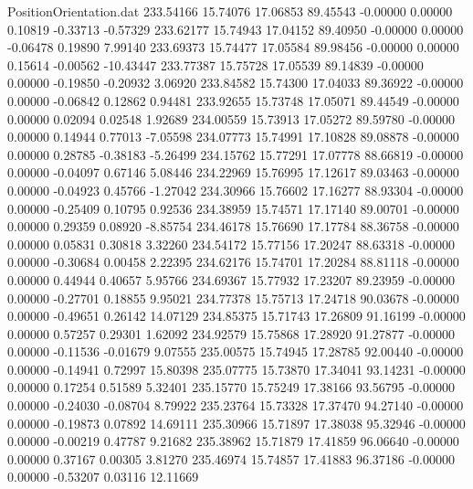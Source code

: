 \begin{filecontents}{PositionOrientation.dat}
 233.54166   15.74076   17.06853    89.45543   -0.00000    0.00000    0.10819   -0.33713   -0.57329
 233.62177   15.74943   17.04152    89.40950   -0.00000    0.00000   -0.06478    0.19890    7.99140
 233.69373   15.74477   17.05584    89.98456   -0.00000    0.00000    0.15614   -0.00562  -10.43447
 233.77387   15.75728   17.05539    89.14839   -0.00000    0.00000   -0.19850   -0.20932    3.06920
 233.84582   15.74300   17.04033    89.36922   -0.00000    0.00000   -0.06842    0.12862    0.94481
 233.92655   15.73748   17.05071    89.44549   -0.00000    0.00000    0.02094    0.02548    1.92689
 234.00559   15.73913   17.05272    89.59780   -0.00000    0.00000    0.14944    0.77013   -7.05598
 234.07773   15.74991   17.10828    89.08878   -0.00000    0.00000    0.28785   -0.38183   -5.26499
 234.15762   15.77291   17.07778    88.66819   -0.00000    0.00000   -0.04097    0.67146    5.08446
 234.22969   15.76995   17.12617    89.03463   -0.00000    0.00000   -0.04923    0.45766   -1.27042
 234.30966   15.76602   17.16277    88.93304   -0.00000    0.00000   -0.25409    0.10795    0.92536
 234.38959   15.74571   17.17140    89.00701   -0.00000    0.00000    0.29359    0.08920   -8.85754
 234.46178   15.76690   17.17784    88.36758   -0.00000    0.00000    0.05831    0.30818    3.32260
 234.54172   15.77156   17.20247    88.63318   -0.00000    0.00000   -0.30684    0.00458    2.22395
 234.62176   15.74701   17.20284    88.81118   -0.00000    0.00000    0.44944    0.40657    5.95766
 234.69367   15.77932   17.23207    89.23959   -0.00000    0.00000   -0.27701    0.18855    9.95021
 234.77378   15.75713   17.24718    90.03678   -0.00000    0.00000   -0.49651    0.26142   14.07129
 234.85375   15.71743   17.26809    91.16199   -0.00000    0.00000    0.57257    0.29301    1.62092
 234.92579   15.75868   17.28920    91.27877   -0.00000    0.00000   -0.11536   -0.01679    9.07555
 235.00575   15.74945   17.28785    92.00440   -0.00000    0.00000   -0.14941    0.72997   15.80398
 235.07775   15.73870   17.34041    93.14231   -0.00000    0.00000    0.17254    0.51589    5.32401
 235.15770   15.75249   17.38166    93.56795   -0.00000    0.00000   -0.24030   -0.08704    8.79922
 235.23764   15.73328   17.37470    94.27140   -0.00000    0.00000   -0.19873    0.07892   14.69111
 235.30966   15.71897   17.38038    95.32946   -0.00000    0.00000   -0.00219    0.47787    9.21682
 235.38962   15.71879   17.41859    96.06640   -0.00000    0.00000    0.37167    0.00305    3.81270
 235.46974   15.74857   17.41883    96.37186   -0.00000    0.00000   -0.53207    0.03116   12.11669

\end{filecontents}
